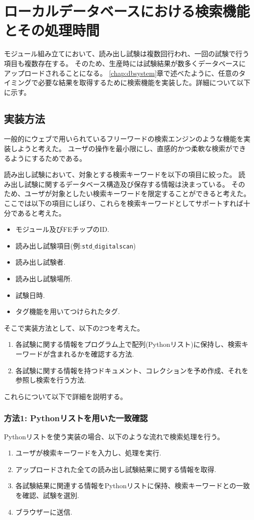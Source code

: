 \chapter{ローカルデータベースにおける検索機能とその処理時間}

モジュール組み立てにおいて、読み出し試験は複数回行われ、一回の試験で行う項目も複数存在する。
そのため、生産時には試験結果が数多くデータベースにアップロードされることになる。
\ref{chap:dbsystem}章で述べたように、任意のタイミングで必要な結果を取得するために検索機能を実装した。詳細について以下に示す。

\section{実装方法}
一般的にウェブで用いられているフリーワードの検索エンジンのような機能を実装しようと考えた。
ユーザの操作を最小限にし、直感的かつ柔軟な検索ができるようにするためである。

読み出し試験において、対象とする検索キーワードを以下の項目に絞った。
読み出し試験に関するデータベース構造及び保存する情報は決まっている。
そのため、ユーザが対象としたい検索キーワードを限定することができると考えた。
ここでは以下の項目にしぼり、これらを検索キーワードとしてサポートすれば十分であると考えた。

\begin{itemize}
  \item モジュール及びFEチップのID.
  \item 読み出し試験項目(例:\texttt{std$\_$digitalscan})
  \item 読み出し試験者.
  \item 読み出し試験場所.
  \item 試験日時.
  \item タグ機能を用いてつけられたタグ.
\end{itemize}

そこで実装方法として、以下の2つを考えた。

\begin{enumerate}
  \item 各試験に関する情報をプログラム上で配列(Pythonリスト)に保持し、検索キーワードが含まれるかを確認する方法.
  \item 各試験に関する情報を持つドキュメント、コレクションを予め作成、それを参照し検索を行う方法.
\end{enumerate}

これらについて以下で詳細を説明する。

\subsection{方法1: Pythonリストを用いた一致確認}
Pythonリストを使う実装の場合、以下のような流れで検索処理を行う。
\begin{enumerate}
  \item ユーザが検索キーワードを入力し、処理を実行.
  \item アップロードされた全ての読み出し試験結果に関する情報を取得.
  \item 各試験結果に関連する情報をPythonリストに保持、検索キーワードとの一致を確認、試験を選別.
  \item ブラウザーに送信.
\end{enumerate}

